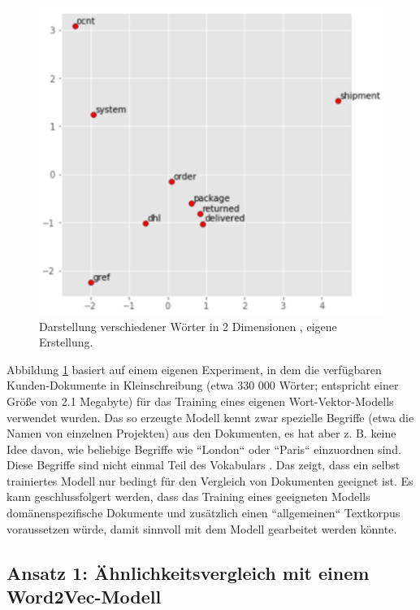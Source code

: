 \begin{figure}[]
\centering
\includegraphics[scale=0.9]{content/pics/Picture_11.png}
\caption{Darstellung verschiedener Wörter in 2 Dimensionen , eigene Erstellung.}
\label{Abbildung:wordvecintuition}
\end{figure}

Abbildung \ref{Abbildung:wordvecintuition} basiert auf einem eigenen Experiment, in dem die verfügbaren Kunden-Dokumente in Kleinschreibung (etwa 330 000 Wörter; entspricht einer Größe von 2.1 Megabyte) für das Training eines eigenen Wort-Vektor-Modells verwendet wurden. Das so erzeugte Modell kennt zwar spezielle Begriffe (etwa die Namen von einzelnen Projekten) aus den Dokumenten, es hat aber z. B. keine Idee davon, wie beliebige Begriffe wie ``London`` oder ``Paris`` einzuordnen sind. Diese Begriffe sind nicht einmal Teil des Vokabulars . Das zeigt, dass ein selbst trainiertes Modell nur bedingt für den Vergleich von Dokumenten geeignet ist. Es kann geschlussfolgert werden, dass das Training eines geeigneten Modells domänenspezifische Dokumente und zusätzlich einen ``allgemeinen`` Textkorpus voraussetzen würde, damit sinnvoll mit dem Modell gearbeitet werden könnte. 

\subsection{Ansatz 1: Ähnlichkeitsvergleich mit einem Word2Vec-Modell}

